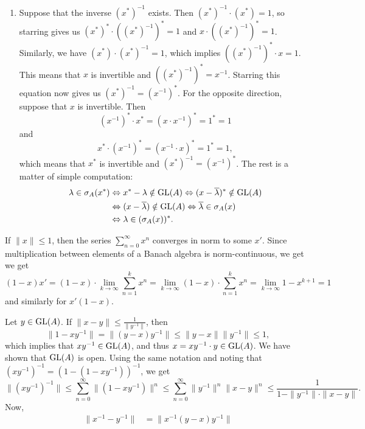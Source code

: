 \begin{myproof}
  \begin{enumerate}
    \item Suppose that the inverse $(x^*)^{-1}$ exists. Then 
    $(x^*)^{-1} \cdot (x^*) = 1$, so starring gives us $(x^*)^* \cdot ((x^*)^{-1})^* = 1$ and $x \cdot ((x^*)^{-1})^* = 1$.
    Similarly, we have $(x^*) \cdot (x^*)^{-1} = 1$, which implies $((x^*)^{-1})^* \cdot x = 1$. This means that 
    $x$ is invertible and $((x^*)^{-1})^* = x^{-1}$. Starring this equation now gives us $(x^*)^{-1} = (x^{-1})^*$.
    For the opposite direction, suppose that $x$ is invertible. Then 
    $$(x^{-1})^* \cdot x^* = (x \cdot x^{-1})^* = 1^* = 1$$
    and $$x^* \cdot (x^{-1})^* = (x^{-1} \cdot x)^* = 1^* = 1,$$
    which means that $x^*$ is invertible and $(x^*)^{-1} = (x^{-1}) ^*$.
    The rest is a matter of simple computation:
    \begin{align*}
      \lambda \in \sigma_A (x^*) &\Leftrightarrow x^* - \lambda \notin \operatorname{GL} (A) \Leftrightarrow (x - \overline{\lambda})^* \notin \operatorname{GL} (A)\\
      &\Leftrightarrow (x - \overline{\lambda}) \notin \operatorname{GL} (A) \Leftrightarrow \overline{\lambda} \in \sigma_A (x)\\
      &\Leftrightarrow \lambda \in (\sigma_A (x))^*.
    \end{align*}
  \end{enumerate}
  \item If $\| x \| \leq 1$, then the series $\sum_{n = 0} ^\infty x^n$ converges in norm to some $x'$.
  Since multiplication between elements of a Banach algebra is norm-continuous, we get
  we get $$(1 - x) x' = (1 - x) \cdot \lim_{k \to \infty} \sum_{n = 1} ^k x^n = \lim_{k \to \infty} (1 - x) \cdot \sum_{n = 1} ^k x^n = \lim_{k \to \infty} 1 - x^{k + 1} = 1$$
  and similarly for $x' (1 - x)$.
  \item Let $y \in \operatorname{GL} (A)$. If $\|x - y\| \leq \frac{1}{\|y^{-1}\|}$, 
  then $$\| 1 - xy^{-1}\| = \| (y - x) y^{-1}\| \leq \| y - x\| \|y^{-1}\| \leq 1,$$
  which implies that $xy^{-1} \in \operatorname{GL} (A)$, and thus $x = xy^{-1} \cdot y \in \operatorname{GL} (A)$. We have shown that $\operatorname{GL}(A)$ is open.
  Using the same notation and noting that $(xy^{-1})^{-1} = (1-(1 - xy^{-1}))^{-1}$, we get 
  $$\|(xy^{-1})^{-1}\| \leq \sum_{n = 0} ^\infty \| (1 - xy^{-1}) \|^n \leq \sum_{n = 0} ^\infty \| y^{-1} \|^n \|x - y \|^n \leq \frac{1}{1 - \|y^{-1}\| \cdot \|x - y\|}.$$
  Now,
  \begin{align*}
    \| x^{-1} - y^{-1}\| &= \| x^{-1} (y - x) y^{-1}\| \\

\end{align*}
\end{myproof}

